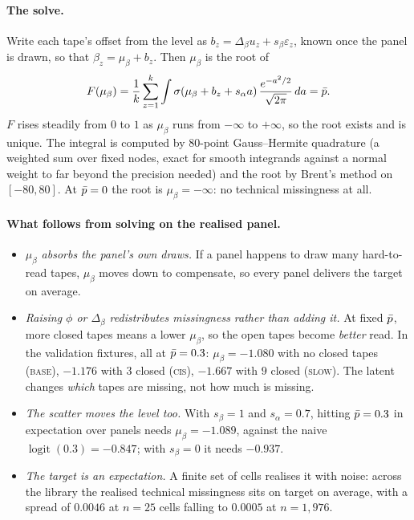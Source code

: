 \paragraph{The solve.} Write each tape's offset from the level as $b_z=\Delta_\beta u_z+s_\beta
\varepsilon_z$, known once the panel is drawn, so that $\beta_z=\mu_\beta+b_z$. Then $\mu_\beta$ is the
root of
\begin{equation}
  F(\mu_\beta)=\frac1k\sum_{z=1}^k\int\sigma(\mu_\beta+b_z+s_\alpha a)\,
  \frac{e^{-a^2/2}}{\sqrt{2\pi}}\,da=\bar p .
  \label{eq:pbarsolve}
\end{equation}
$F$ rises steadily from $0$ to $1$ as $\mu_\beta$ runs from $-\infty$ to $+\infty$, so the root exists
and is unique. The integral is computed by 80-point Gauss--Hermite quadrature (a weighted sum over fixed
nodes, exact for smooth integrands against a normal weight to far beyond the precision needed) and the
root by Brent's method on $[-80,80]$. At $\bar p=0$ the root is $\mu_\beta=-\infty$: no technical
missingness at all.

\paragraph{What follows from solving on the realised panel.}
\begin{itemize}
  \item \emph{$\mu_\beta$ absorbs the panel's own draws.} If a panel happens to draw many hard-to-read
        tapes, $\mu_\beta$ moves down to compensate, so every panel delivers the target on average.
  \item \emph{Raising $\phi$ or $\Delta_\beta$ redistributes missingness rather than adding it.} At fixed
        $\bar p$, more closed tapes means a lower $\mu_\beta$, so the open tapes become \emph{better} read.
        In the validation fixtures, all at $\bar p=0.3$: $\mu_\beta=-1.080$ with no closed tapes
        (\textsc{base}), $-1.176$ with $3$ closed (\textsc{cis}), $-1.667$ with $9$ closed
        (\textsc{slow}). The latent changes \emph{which} tapes are missing, not how much is missing.
  \item \emph{The scatter moves the level too.} With $s_\beta=1$ and $s_\alpha=0.7$, hitting
        $\bar p=0.3$ in expectation over panels needs $\mu_\beta=-1.089$, against the naive
        $\operatorname{logit}(0.3)=-0.847$; with $s_\beta=0$ it needs $-0.937$.
  \item \emph{The target is an expectation.} A finite set of cells realises it with noise: across the
        library the realised technical missingness sits on target on average, with a spread of $0.0046$
        at $n=25$ cells falling to $0.0005$ at $n=1{,}976$.
\end{itemize}

